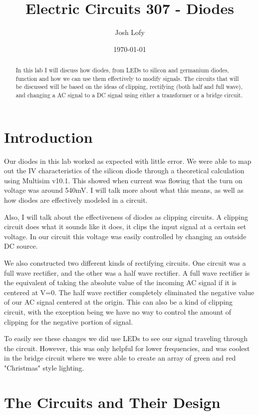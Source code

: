 \documentclass[a4paper]{article}
\title{Electric Circuits 307 - Diodes}
\author{Josh Lofy}
\date{\today}
\begin{document}
\maketitle

\begin{abstract}
In this lab I will discuss how diodes, from LEDs to silicon and germanium diodes, function and how we can use them effectively to modify signals.  The circuits that will be discussed will be based on the ideas of clipping, rectifying (both half and full wave), and changing a AC signal to a DC signal using either a transformer or a bridge circuit.
\end{abstract}

\section{Introduction}

Our diodes in this lab worked as expected with little error.  We were able to map out the IV characteristics of the silicon diode through a theoretical calculation using Multisim v10.1.  This showed when current was flowing that the turn on voltage was around 540mV.  I will talk more about what this means, as well as how diodes are effectively modeled in a circuit.

Also, I will talk about the effectiveness of diodes as clipping circuits.  A clipping circuit does what it sounds like it does, it clips the input signal at a certain set voltage.  In our circuit this voltage was easily controlled by changing an outside DC source.

We also constructed two different kinds of rectifying circuits.  One circuit was a full wave rectifier, and the other was a half wave rectifier.  A full wave rectifier is the equivalent of taking the absolute value of the incoming AC signal if it is centered at V=0.  The half wave rectifier completely eliminated the negative value of our AC signal centered at the origin.  This can also be a kind of clipping circuit, with the exception being we have no way to control the amount of clipping for the negative portion of signal.

To easily see these changes we did use LEDs to see our signal traveling through the circuit.  However, this was only helpful for lower frequencies, and was coolest in the bridge circuit where we were able to create an array of green and red "Christmas" style lighting.

\section{The Circuits and Their Design}
\end{document}
